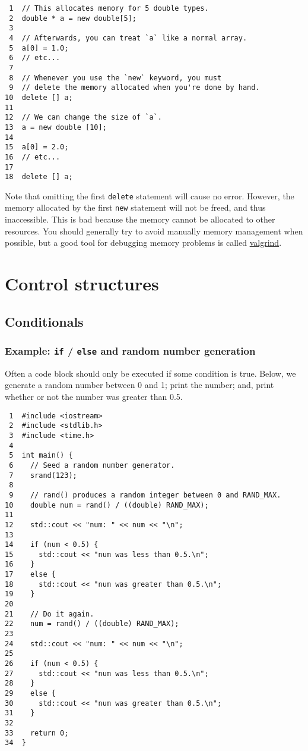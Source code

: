 \documentclass[11pt]{article}
\begin{document}
\begin{verbatim}
 1  // This allocates memory for 5 double types.
 2  double * a = new double[5];
 3  
 4  // Afterwards, you can treat `a` like a normal array.
 5  a[0] = 1.0;
 6  // etc...
 7  
 8  // Whenever you use the `new` keyword, you must
 9  // delete the memory allocated when you're done by hand.
10  delete [] a;
11  
12  // We can change the size of `a`.
13  a = new double [10];
14  
15  a[0] = 2.0;
16  // etc...
17  
18  delete [] a;
\end{verbatim}

Note that omitting the first \texttt{delete} statement will cause no error. 
However, the memory allocated by the first \texttt{new} statement will not 
be freed, and thus inaccessible. This is bad because the memory cannot 
be allocated to other resources. You should generally try to avoid 
manually memory management when possible, but a good tool for debugging 
memory problems is called \href{http://valgrind.org/}{valgrind}. 

\section{Control structures}
\label{sec:orgheadline34}
\subsection{Conditionals}
\label{sec:orgheadline10}
\subsubsection{Example: \texttt{if} / \texttt{else} and random number generation}
\label{sec:orgheadline25}
Often a code block should only be executed if some condition is true. 
Below, we generate a random number between 0 and 1; print the number; and,
print whether or not the number was greater than 0.5.

\begin{verbatim}
 1  #include <iostream>
 2  #include <stdlib.h>
 3  #include <time.h>
 4  
 5  int main() {
 6    // Seed a random number generator.
 7    srand(123);
 8  
 9    // rand() produces a random integer between 0 and RAND_MAX.
10    double num = rand() / ((double) RAND_MAX);
11  
12    std::cout << "num: " << num << "\n";
13  
14    if (num < 0.5) {
15      std::cout << "num was less than 0.5.\n";
16    }
17    else {
18      std::cout << "num was greater than 0.5.\n";
19    }
20  
21    // Do it again.
22    num = rand() / ((double) RAND_MAX);
23  
24    std::cout << "num: " << num << "\n";
25  
26    if (num < 0.5) {
27      std::cout << "num was less than 0.5.\n";
28    }
29    else {
30      std::cout << "num was greater than 0.5.\n";
31    }
32  
33    return 0;
34  }
\end{verbatim}
\end{document}
